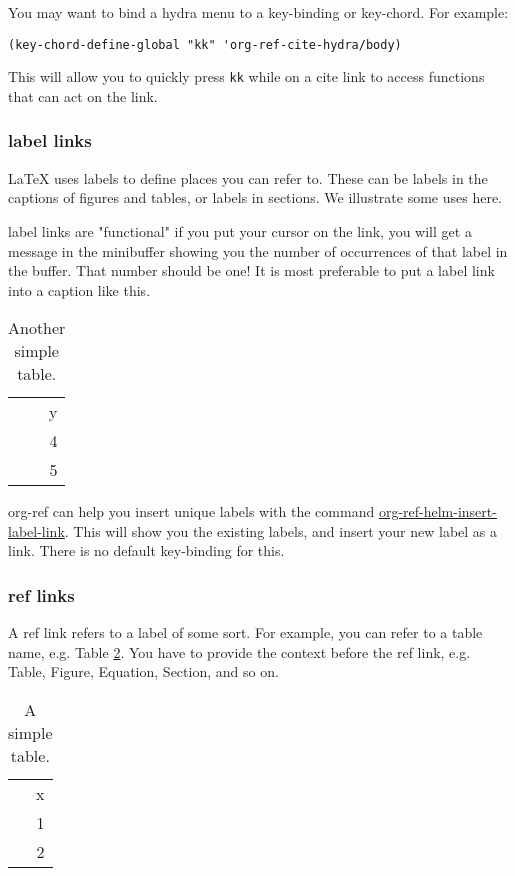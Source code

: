 \documentclass[11pt]{article}
\begin{document}
You may want to bind a hydra menu to a key-binding or key-chord. For example:

\begin{verbatim}
(key-chord-define-global "kk" 'org-ref-cite-hydra/body)
\end{verbatim}

This will allow you to quickly press \verb~kk~ while on a cite link to access functions that can act on the link.

\subsubsection{label links}
\label{sec-1-1-3}

\LaTeX{} uses labels to define places you can refer to. These can be labels in the captions of figures and tables, or labels in sections. We illustrate some uses here.

label links are "functional" if you put your cursor on the link, you will get a message in the minibuffer showing you the number of occurrences of that label in the buffer. That number should be one! It is most preferable to put a label link into a caption like this.
\begin{table}[htb]
\caption{Another simple table. \label{tab-ydata}}
\centering
\begin{tabular}{r}
y\\
4\\
5\\
\end{tabular}
\end{table}

org-ref can help you insert unique labels with the command \url{org-ref-helm-insert-label-link}. This will show you the existing labels, and insert your new label as a link. There is no default key-binding for this.

\subsubsection{ref links}
\label{sec-1-1-4}

A ref link refers to a label of some sort. For example, you can refer to a table name, e.g. Table \ref{table-1}. You have to provide the context before the ref link, e.g. Table, Figure, Equation, Section, and so on.

\begin{table}[htb]
\caption{\label{table-1}A simple table.}
\centering
\begin{tabular}{r}
x\\
1\\
2\\
\end{tabular}
\end{table}
\end{document}
